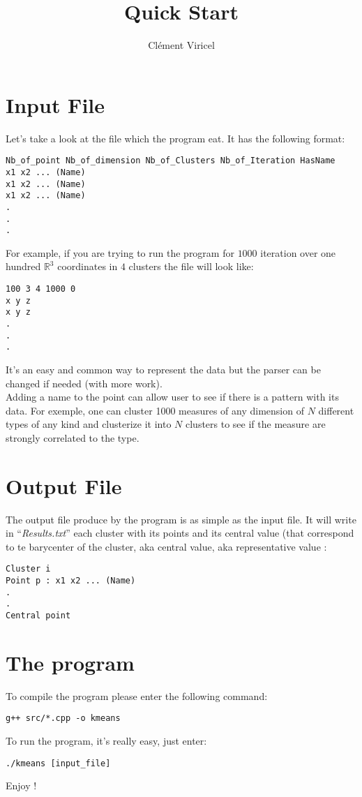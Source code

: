 \documentclass[12pt]{article}
\title{Quick Start}
\author{Cl\'ement Viricel}
\begin{document}
\maketitle
\section{Input File}
Let's take a look at the file which the program eat. It has the following format:
\begin{verbatim}
Nb_of_point Nb_of_dimension Nb_of_Clusters Nb_of_Iteration HasName
x1 x2 ... (Name)
x1 x2 ... (Name)
x1 x2 ... (Name)
.
.
.
\end{verbatim}
For example, if you are trying to run the program for $1000$ iteration over one hundred $\mathbb{R}^3$ coordinates in $4$ clusters the file will look like:
\begin{verbatim}
100 3 4 1000 0
x y z
x y z
.
.
.
\end{verbatim}
It's an easy and common way to represent the data but the parser can be changed if needed (with more work). \\
Adding a name to the point can allow user to see if there is a pattern with its data. For exemple, one can cluster 1000 measures of any dimension of $N$ different types of any kind and clusterize it into $N$ clusters to see if the measure are strongly correlated to the type.
\section{Output File}
The output file produce by the program is as simple as the input file. It will write in ``\textit{Results.txt}'' each cluster with its points and its central value (that correspond to te barycenter of the cluster, aka central value, aka representative value :
\begin{verbatim}
Cluster i
Point p : x1 x2 ... (Name)
.
.
Central point
\end{verbatim}
\section{The program}
To compile the program please enter the following command:
\begin{verbatim}
g++ src/*.cpp -o kmeans
\end{verbatim}
To run the program, it's really easy, just enter:
\begin{verbatim}
./kmeans [input_file]
\end{verbatim}
Enjoy !
\end{document}
